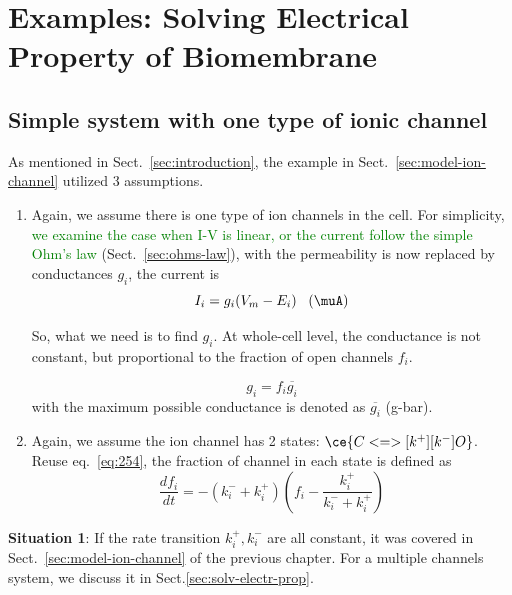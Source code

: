 \section[Solving Electrical Property of Biomembrane]{Examples: Solving
Electrical Property of Biomembrane}
\label{sec:exampl-ionic-curr}

\subsection{Simple system with one type of ionic channel}

As mentioned in Sect.~\ref{sec:introduction}, the example in
Sect.~\ref{sec:model-ion-channel} utilized 3 assumptions.
\begin{enumerate}
\item Again, we assume there is one type of ion channels in the
  cell. For simplicity,
  \textcolor{green}{we examine the case when I-V is linear, or the
    current follow the simple Ohm's law}
  (Sect.~\ref{sec:ohms-law}), with the permeability is now replaced by
  conductances $g_i$, the current is
  \begin{equation}
    \label{eq:1413}
    I_i = g_i (V_m-E_i) \;\;\; \text{($\muA$)}
  \end{equation}

  So, what we need is to find $g_i$. At whole-cell level, the
  conductance is not constant, but proportional to the fraction of open
  channels $f_i$.

  \begin{equation}
    \label{eq:34}
    g_i = f_i \overline{g_i}
  \end{equation}
  with the maximum possible conductance is denoted as $\overline{g_i}$
  (g-bar).

\item Again, we assume the ion channel has 2 states:
  $\ce{C <=>[k^+][k^-] O}$. Reuse eq.~\eqref{eq:254}, the fraction of
  channel in each state is defined as
  \begin{equation}
    \label{eq:257}
    \frac{df_i}{dt}  =  - (k_i^-+ k_i^+) (f_i - \frac{k_i^+}{k_i^-+ k_i^+})
  \end{equation}
\end{enumerate}

{\bf Situation 1}: If the rate transition $k^+_i, k^-_i$ are all constant,
it was covered in Sect.~\ref{sec:model-ion-channel} of the previous chapter. For
a multiple channels system, we discuss it in Sect.\ref{sec:solv-electr-prop}.


